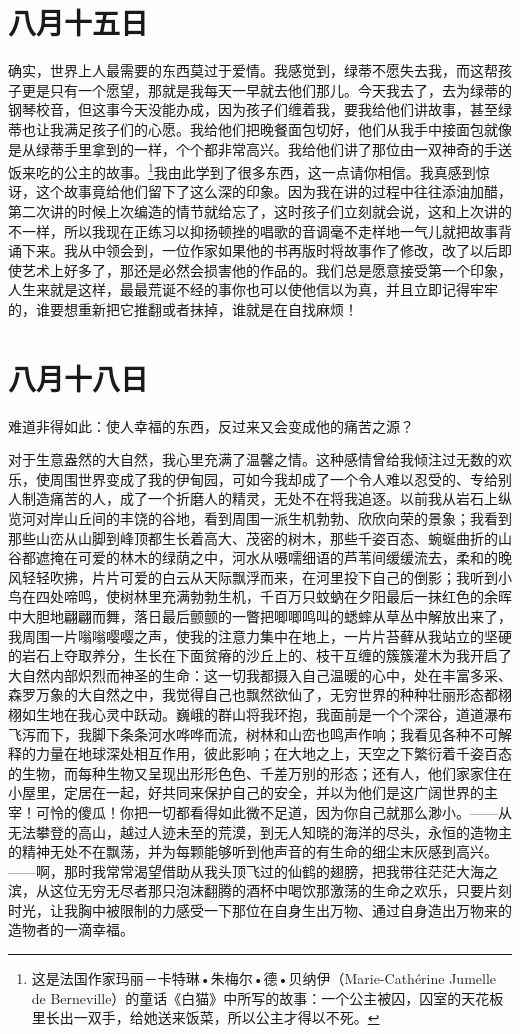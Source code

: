 \documentclass[12pt,oneside]{book}
\begin{document}
\chapter{八月十五日}
确实，世界上人最需要的东西莫过于爱情。我感觉到，绿蒂不愿失去我，而这帮孩子更是只有一个愿望，那就是我每天一早就去他们那儿。今天我去了，去为绿蒂的钢琴校音，但这事今天没能办成，因为孩子们缠着我，要我给他们讲故事，甚至绿蒂也让我满足孩子们的心愿。我给他们把晚餐面包切好，他们从我手中接面包就像是从绿蒂手里拿到的一样，个个都非常高兴。我给他们讲了那位由一双神奇的手送饭来吃的公主的故事。\footnote{这是法国作家玛丽－卡特琳•朱梅尔•德•贝纳伊（Marie-Cathérine Jumelle de Berneville）的童话《白猫》中所写的故事：一个公主被囚，囚室的天花板里长出一双手，给她送来饭菜，所以公主才得以不死。}我由此学到了很多东西，这一点请你相信。我真感到惊讶，这个故事竟给他们留下了这么深的印象。因为我在讲的过程中往往添油加醋，第二次讲的时候上次编造的情节就给忘了，这时孩子们立刻就会说，这和上次讲的不一样，所以我现在正练习以抑扬顿挫的唱歌的音调毫不走样地一气儿就把故事背诵下来。我从中领会到，一位作家如果他的书再版时将故事作了修改，改了以后即使艺术上好多了，那还是必然会损害他的作品的。我们总是愿意接受第一个印象，人生来就是这样，最最荒诞不经的事你也可以使他信以为真，并且立即记得牢牢的，谁要想重新把它推翻或者抹掉，谁就是在自找麻烦！


\chapter{八月十八日}
难道非得如此：使人幸福的东西，反过来又会变成他的痛苦之源？

对于生意盎然的大自然，我心里充满了温馨之情。这种感情曾给我倾注过无数的欢乐，使周围世界变成了我的伊甸园，可如今我却成了一个令人难以忍受的、专给别人制造痛苦的人，成了一个折磨人的精灵，无处不在将我追逐。以前我从岩石上纵览河对岸山丘间的丰饶的谷地，看到周围一派生机勃勃、欣欣向荣的景象；我看到那些山峦从山脚到峰顶都生长着高大、茂密的树木，那些千姿百态、蜿蜒曲折的山谷都遮掩在可爱的林木的绿荫之中，河水从嗫嚅细语的芦苇间缓缓流去，柔和的晚风轻轻吹拂，片片可爱的白云从天际飘浮而来，在河里投下自己的倒影；我听到小鸟在四处啼鸣，使树林里充满勃勃生机，千百万只蚊蚋在夕阳最后一抹红色的余晖中大胆地翩翩而舞，落日最后颤颤的一瞥把唧唧鸣叫的蟋蟀从草丛中解放出来了，我周围一片嗡嗡嘤嘤之声，使我的注意力集中在地上，一片片苔藓从我站立的坚硬的岩石上夺取养分，生长在下面贫瘠的沙丘上的、枝干互缠的簇簇灌木为我开启了大自然内部炽烈而神圣的生命：这一切我都摄入自己温暖的心中，处在丰富多采、森罗万象的大自然之中，我觉得自己也飘然欲仙了，无穷世界的种种壮丽形态都栩栩如生地在我心灵中跃动。巍峨的群山将我环抱，我面前是一个个深谷，道道瀑布飞泻而下，我脚下条条河水哗哗而流，树林和山峦也鸣声作响；我看见各种不可解释的力量在地球深处相互作用，彼此影响；在大地之上，天空之下繁衍着千姿百态的生物，而每种生物又呈现出形形色色、千差万别的形态；还有人，他们家家住在小屋里，定居在一起，好共同来保护自己的安全，并以为他们是这广阔世界的主宰！可怜的傻瓜！你把一切都看得如此微不足道，因为你自己就那么渺小。——从无法攀登的高山，越过人迹未至的荒漠，到无人知晓的海洋的尽头，永恒的造物主的精神无处不在飘荡，并为每颗能够听到他声音的有生命的细尘末灰感到高兴。——啊，那时我常常渴望借助从我头顶飞过的仙鹤的翅膀，把我带往茫茫大海之滨，从这位无穷无尽者那只泡沫翻腾的酒杯中喝饮那激荡的生命之欢乐，只要片刻时光，让我胸中被限制的力感受一下那位在自身生出万物、通过自身造出万物来的造物者的一滴幸福。
\end{document}
